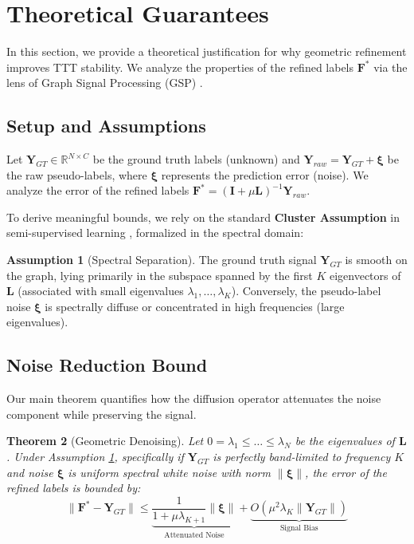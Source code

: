 \documentclass{article}
\theoremstyle{plain}
\newtheorem{theorem}{Theorem}[section]
\theoremstyle{definition}
\newtheorem{assumption}[theorem]{Assumption}
\theoremstyle{remark}
\newcommand{\R}{\mathbb{R}}
\newcommand{\Lap}{\mathbf{L}}      %
\newcommand{\F}{\mathbf{F}}        %
\newcommand{\Y}{\mathbf{Y}}        %
\begin{document}
\section{Theoretical Guarantees}
\label{sec:theory}

In this section, we provide a theoretical justification for why geometric refinement improves TTT stability. We analyze the properties of the refined labels $\F^*$ via the lens of Graph Signal Processing (GSP) \cite{bronstein2017geometric}.

\subsection{Setup and Assumptions}
Let $\Y_{GT} \in \R^{N \times C}$ be the ground truth labels (unknown) and $\Y_{raw} = \Y_{GT} + \boldsymbol{\xi}$ be the raw pseudo-labels, where $\boldsymbol{\xi}$ represents the prediction error (noise).
We analyze the error of the refined labels $\F^* = (\mathbf{I} + \mu \Lap)^{-1} \Y_{raw}$.

To derive meaningful bounds, we rely on the standard \textbf{Cluster Assumption} in semi-supervised learning \cite{chapelle2005manifold, belkin2006manifoldreg}, formalized in the spectral domain:

\begin{assumption}[Spectral Separation]
\label{ass:spectral}
The ground truth signal $\Y_{GT}$ is smooth on the graph, lying primarily in the subspace spanned by the first $K$ eigenvectors of $\Lap$ (associated with small eigenvalues $\lambda_1, \dots, \lambda_K$). Conversely, the pseudo-label noise $\boldsymbol{\xi}$ is spectrally diffuse or concentrated in high frequencies (large eigenvalues).
\end{assumption}

\subsection{Noise Reduction Bound}
Our main theorem quantifies how the diffusion operator attenuates the noise component while preserving the signal.

\begin{theorem}[Geometric Denoising]
\label{thm:denoising}
Let $0 = \lambda_1 \le \dots \le \lambda_N$ be the eigenvalues of $\Lap$. Under Assumption \ref{ass:spectral}, specifically if $\Y_{GT}$ is perfectly band-limited to frequency $K$ and noise $\boldsymbol{\xi}$ is uniform spectral white noise with norm $\|\boldsymbol{\xi}\|$, the error of the refined labels is bounded by:
\begin{equation}
    \|\F^* - \Y_{GT}\| \le \underbrace{\frac{1}{1 + \mu \lambda_{K+1}} \|\boldsymbol{\xi}\|}_\text{Attenuated Noise} + \underbrace{O(\mu^2 \lambda_K \|\Y_{GT}\|)}_\text{Signal Bias}
\end{equation}
\end{theorem}
\end{document}
